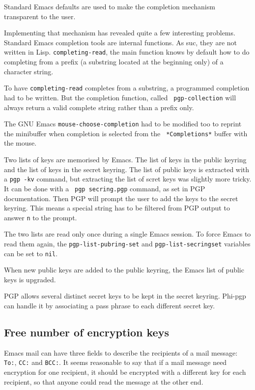 Standard Emacs defaults are   used  to make the  completion  mechanism
transparent to the user.

Implementing  that  mechanism  has revealed  quite  a  few interesting
problems.  Standard Emacs completion  tools are internal functions. As
suc, they are  not written in Lisp.   {\tt completing-read},  the main
function knows  by  default how  to  do  completing from  a prefix  (a
substring located at the beginning only) of a character string.

To have {\tt completing-read} completes from a substring, a programmed
completion had to be written. But the completion function, called {\tt
pgp-collection} will always return a valid complete string rather than
a prefix only.

The GNU Emacs {\tt mouse-choose-completion}  had to be modified too to
reprint the minibuffer   when  completion is selected   from  the {\tt
*Completions*} buffer with the mouse.

Two lists of keys are memorised  by Emacs.  The  list of keys in the public
keyring and the list  of keys in the secret keyring.   The list  of public
keys is  extracted with a {\tt  pgp~-kv}  command, but extracting the list of scret keys was slightly more tricky. It can  be done with a {\tt
pgp~secring.pgp} command, as set  in  PGP documentation.   Then PGP
will prompt the user to add the keys to the secret keyring. This means
a special string has to be filtered from PGP output  to answer {\tt n}
to the prompt.

\begin{sloppypar}
The two lists  are read only once  during a single  Emacs session.  To
force  Emacs  to read them again,  the  {\tt pgp-list-pubring-set} and
{\tt pgp-list-secring\-set} variables can be set to {\tt nil}.
\end{sloppypar}

When new public keys are  added to the  public keyring, the Emacs list
of public keys is upgraded.

PGP  allows  several distinct  secret  keys to  be kept  in the secret
keyring. Phi-pgp  can handle it by  associating a pass phrase to each
different secret key.

\subsection{Free number of encryption keys}

Emacs mail can have three fields to describe  the recipients of a mail
message: {\tt To:},  {\tt CC:} and {\tt  BCC:}. It seems reasonable to
say that  if  a mail message  need  encryption  for one recipient,  it
should be encrypted  with a different  key for each recipient, so that
anyone could read the message at the other end.

